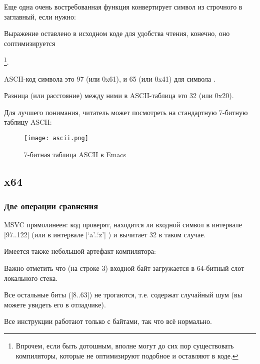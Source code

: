 
Еще одна очень востребованная функция конвертирует символ из строчного в заглавный, если нужно:



Выражение  оставлено в исходном коде для удобства чтения, 
конечно, оно соптимизируется

\footnote{Впрочем, если быть дотошным, вполне могут до сих пор существовать компиляторы,
которые не оптимизируют подобное и оставляют в коде.}.

\ac{ASCII}-код символа  это 97 (или 0x61), и 65 (или 0x41) для символа .

Разница (или расстояние) между ними в \ac{ASCII}-таблица это 32 (или 0x20).

Для лучшего понимания, читатель может посмотреть на стандартную 7-битную таблицу \ac{ASCII}:

\begin{figure}[H]
\centering
\texttt{[image: ascii.png]}
\caption{7-битная таблица \ac{ASCII} в Emacs}
\end{figure}

\subsection{x64}

\subsubsection{Две операции сравнения}

\NonOptimizing MSVC прямолинеен: код проверят, находится ли входной символ в интервале [97..122]
(или в интервале [`a'..`z'] ) и вычитает 32 в таком случае.

Имеется также небольшой артефакт компилятора:



Важно отметить что (на строке 3) входной байт загружается в 64-битный слот локального стека.

Все остальные биты ([8..63]) не трогаются, т.е. содержат случайный шум (вы можете увидеть его в отладчике).

Все инструкции работают только с байтами, так что всё нормально.

